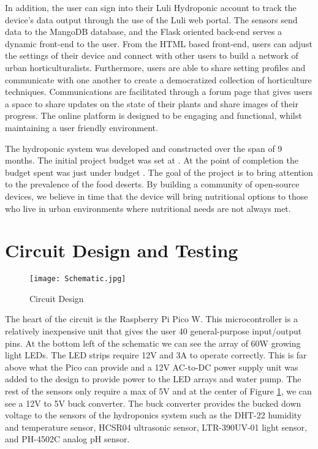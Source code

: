 \documentclass[12pt]{article} %
\begin{document}
In addition, the user can sign into their Luli Hydroponic account to track the device’s data output through the use of the Luli web portal. The sensors send data to the MangoDB database, and the Flask oriented back-end serves a dynamic front-end to the user. From the HTML based front-end, users can adjust the settings of their device and connect with other users to build a network of urban horticulturalists. Furthermore, users are able to share setting profiles and communicate with one another to create a democratized collection of horticulture techniques. Communications are facilitated through a forum page that gives users a space to share updates on the state of their plants and share images of their progress. The online platform is designed to be engaging and functional, whilst maintaining a user friendly environment. 

\pagebreak

The hydroponic system was developed and constructed over the span of 9 months. The initial project budget was set at . At the point of completion the budget spent was just under budget . The goal of the project is to bring attention to the prevalence of the food deserts. By building a community of open-source devices, we believe in time that the device will bring nutritional options to those who live in urban environments where nutritional needs are not always met.

\section {Circuit Design and Testing}

\begin{figure}[H]
  \centering
  \texttt{[image: Schematic.jpg]}
  \caption{Circuit Design}
  \label{fig:Schematic}
\end{figure}

The heart of the circuit is the Raspberry Pi Pico W. This microcontroller is a relatively inexpensive unit that gives the user 40 general-purpose input/output pins. At the bottom left of the schematic we can see the array of 60W growing light LEDs. The LED strips require 12V and 3A to operate correctly. This is far above what the Pico can provide and a 12V AC-to-DC power supply unit was added to the design to provide power to the LED arrays and water pump. The rest of the sensors only require a max of 5V and at the center of Figure \ref{fig:Schematic}, we can see a 12V to 5V buck converter. The buck converter provides the bucked down voltage to the sensors of the hydroponics system such as the DHT-22 humidity and temperature sensor, HCSR04 ultrasonic sensor, LTR-390UV-01 light sensor, and PH-4502C analog pH sensor. 
\end{document}
